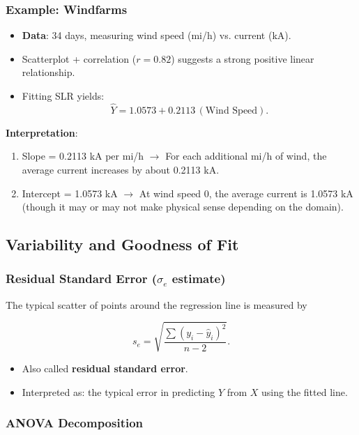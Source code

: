\documentclass[10pt]{extarticle}
\begin{document}
\subsubsection{Example: Windfarms}

\begin{itemize}
    \item \textbf{Data}: 34 days, measuring wind speed (mi/h) vs. current (kA).
    \item Scatterplot + correlation ($r=0.82$) suggests a strong positive linear relationship.
    \item Fitting SLR yields:
          \[
              \hat{Y} = 1.0573 + 0.2113\,(\text{Wind Speed}).
          \]
\end{itemize}

\textbf{Interpretation}:
\begin{enumerate}
    \item Slope = 0.2113 kA per mi/h $\rightarrow$ For each additional mi/h of wind, the average current increases by about 0.2113 kA.
    \item Intercept = 1.0573 kA $\rightarrow$ At wind speed 0, the average current is 1.0573 kA (though it may or may not make physical sense depending on the domain).
\end{enumerate}



\subsection{Variability and Goodness of Fit}

\subsubsection{Residual Standard Error ($\sigma_e$ estimate)}

The typical scatter of points around the regression line is measured by

\[
    s_e = \sqrt{\frac{\sum (y_i - \hat{y}_i)^2}{n - 2}}.
\]

\begin{itemize}
    \item Also called \textbf{residual standard error}.
    \item Interpreted as: the typical error in predicting $Y$ from $X$ using the fitted line.
\end{itemize}

\subsubsection{ANOVA Decomposition}
\end{document}
